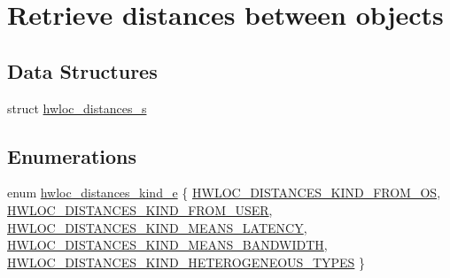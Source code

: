 \hypertarget{a00208}{}\section{Retrieve distances between objects}
\label{a00208}
\subsection*{Data Structures}
\begin{DoxyCompactItemize}
\item 
struct \hyperlink{a00310}{hwloc\+\_\+distances\+\_\+s}
\end{DoxyCompactItemize}
\subsection*{Enumerations}
\begin{DoxyCompactItemize}
\item 
enum \hyperlink{a00208_gab1bb10d3adb85b52cdc6fe5a7f74f108}{hwloc\+\_\+distances\+\_\+kind\+\_\+e} \{ \newline
\hyperlink{a00208_ggab1bb10d3adb85b52cdc6fe5a7f74f108a90dc38248c8d5392d4dd3e88f391e984}{H\+W\+L\+O\+C\+\_\+\+D\+I\+S\+T\+A\+N\+C\+E\+S\+\_\+\+K\+I\+N\+D\+\_\+\+F\+R\+O\+M\+\_\+\+OS}, 
\hyperlink{a00208_ggab1bb10d3adb85b52cdc6fe5a7f74f108a0148d7f9be833a04f5a55455437c227b}{H\+W\+L\+O\+C\+\_\+\+D\+I\+S\+T\+A\+N\+C\+E\+S\+\_\+\+K\+I\+N\+D\+\_\+\+F\+R\+O\+M\+\_\+\+U\+S\+ER}, 
\hyperlink{a00208_ggab1bb10d3adb85b52cdc6fe5a7f74f108afd6a3503fbc8f7c1a31235373cefc4c6}{H\+W\+L\+O\+C\+\_\+\+D\+I\+S\+T\+A\+N\+C\+E\+S\+\_\+\+K\+I\+N\+D\+\_\+\+M\+E\+A\+N\+S\+\_\+\+L\+A\+T\+E\+N\+CY}, 
\hyperlink{a00208_ggab1bb10d3adb85b52cdc6fe5a7f74f108a41b19f141a3c0ffe85f9affaca4b0293}{H\+W\+L\+O\+C\+\_\+\+D\+I\+S\+T\+A\+N\+C\+E\+S\+\_\+\+K\+I\+N\+D\+\_\+\+M\+E\+A\+N\+S\+\_\+\+B\+A\+N\+D\+W\+I\+D\+TH}, 
\newline
\hyperlink{a00208_ggab1bb10d3adb85b52cdc6fe5a7f74f108aa6cf2b6dfcf148b65952f811814efbe1}{H\+W\+L\+O\+C\+\_\+\+D\+I\+S\+T\+A\+N\+C\+E\+S\+\_\+\+K\+I\+N\+D\+\_\+\+H\+E\+T\+E\+R\+O\+G\+E\+N\+E\+O\+U\+S\+\_\+\+T\+Y\+P\+ES}
 \}
\end{DoxyCompactItemize}
